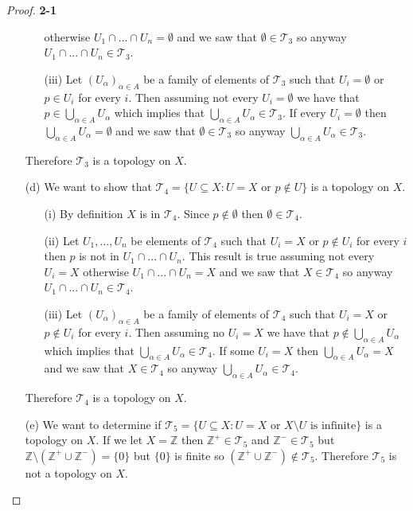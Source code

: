 \documentclass[11pt]{article}
\newcommand{\Z}{\mathbb{Z}}
\newcommand{\Topo}{\mathcal{T}}
\newcommand{\Or}{\text{ or }}
\newcommand{\setmin}{\setminus}
\theoremstyle{definition}
\begin{document}
\begin{proof}{\textbf{2-1}}
\begin{itemize}
\begin{itemize}
                otherwise $U_1 \cap ... \cap U_n = \emptyset$ and we saw
                that $\emptyset \in \Topo_3$ so anyway 
                $U_1 \cap ... \cap U_n \in \Topo_3$.
                \item [(iii)] Let $(U_\alpha)_{\alpha \in A}$ be a family of
                elements of $\Topo_3$  such that
                $U_i = \emptyset$ or $p \in U_i$ for every $i$. Then
                assuming not every $U_i = \emptyset$ we have that
                $p \in \bigcup_{\alpha \in A} U_\alpha$ which implies that
                $\bigcup_{\alpha \in A} U_\alpha \in \Topo_3$. If every
                $U_i = \emptyset$ then $\bigcup_{\alpha \in A} U_\alpha = \emptyset$
                and we saw that $\emptyset \in \Topo_3$ so anyway 
                $\bigcup_{\alpha \in A} U_\alpha \in \Topo_3$.
            \end{itemize} 
        Therefore $\Topo_3$ is a topology on $X$.        
        \item [(d)] We want to show that
        $\Topo_4 = \{U \subseteq X: U = X \text{ or }p \not\in U\}$
        is a topology on $X$.
            \begin{itemize}
                \item [(i)] By definition $X$ is in $\Topo_4$.
                Since $p \not\in \emptyset$ then $\emptyset \in \Topo_4$.
                \item [(ii)] Let $U_1, ..., U_n$ be elements of $\Topo_4$
                such that $U_i = X$ or $p \not\in U_i$ for every $i$ then 
                $p$ is not in $U_1 \cap ... \cap U_n$.
                This result is true assuming not every $U_i = X$
                otherwise $U_1 \cap ... \cap U_n = X$ and we saw
                that $X \in \Topo_4$ so anyway 
                $U_1 \cap ... \cap U_n \in \Topo_4$.
                \item [(iii)] Let $(U_\alpha)_{\alpha \in A}$ be a family of
                elements of $\Topo_4$  such that
                $U_i = X$ or $p \not\in U_i$ for every $i$. Then
                assuming no $U_i = X$ we have that
                $p \not\in \bigcup_{\alpha \in A} U_\alpha$ which implies that
                $\bigcup_{\alpha \in A} U_\alpha \in \Topo_4$. If some
                $U_i = X$ then $\bigcup_{\alpha \in A} U_\alpha = X$
                and we saw that $X \in \Topo_4$ so anyway 
                $\bigcup_{\alpha \in A} U_\alpha \in \Topo_4$.
            \end{itemize} 
        Therefore $\Topo_4$ is a topology on $X$.
        \item [(e)] We want to determine if
        $\Topo_5 = \{U \subseteq X: U = X \Or X \setminus U \text{ is infinite}\}$
        is a topology on $X$.
        If we let $X = \Z$ then $\Z^+ \in \Topo_5$ and $\Z^- \in \Topo_5$ but
        $\Z \setmin (\Z^+ \cup \Z^-) = \{0\}$ but $\{0\}$ is finite so
        $(\Z^+ \cup \Z^-) \not\in \Topo_5$. Therefore $\Topo_5$ is not 
        a topology on $X$.
    \end{itemize}
\end{proof}
\end{document}
